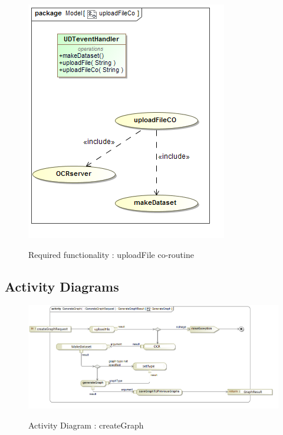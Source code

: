 \documentclass[a4paper,12pt]{article}
\begin{document}
	\begin{figure}[H]
		\includegraphics[width=\textwidth]{Images/uploadFileCoUC.png}  \\
		\caption{Required functionality : uploadFile co-routine}
	\end{figure}

\subsection{Activity Diagrams}

\begin{figure}[H]
		\includegraphics[width=\textwidth]{Images/createGraph__act.png}  \\
		\caption{Activity Diagram : createGraph}
	\end{figure}
\end{document}
